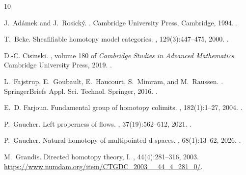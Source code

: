 \documentclass[12pt,a4paper]{amsart}
\theoremstyle{definition}
\begin{document}
\begin{thebibliography}{10}
	
	J.~Ad{\'a}mek and J.~Rosick{\'y}.
	.
	\newblock Cambridge University Press, Cambridge, 1994.
	\newblock \href {https://doi.org/10.1017/CBO9780511600579}
	{}.
	
	T.~Beke.
	\newblock Sheafifiable homotopy model categories.
	, 129(3):447--475, 2000.
	\newblock \href {https://doi.org/10.1017/S0305004100004722}
	{}.
	
	D.-C. Cisinski.
	, volume 180 of {\em
		Cambridge Studies in Advanced Mathematics}.
	\newblock Cambridge University Press, 2019.
	\newblock \href {https://doi.org/10.1017/9781108588737}
	{}.
	
	L.~Fajstrup, E.~Goubault, E.~Haucourt, S.~Mimram, and M.~Raussen.
	.
	\newblock SpringerBriefs Appl. Sci. Technol. Springer, 2016.
	\newblock \href {https://doi.org/10.1007/978-3-319-15398-8}
	{}.
	
	E.~D. Farjoun.
	\newblock Fundamental group of homotopy colimits.
	, 182(1):1--27, 2004.
	\newblock \href {https://doi.org/10.1016/S0001-8708(03)00072-0}
	{}.
	
	P.~Gaucher.
	\newblock Left properness of flows.
	, 37(19):562--612, 2021.
	\newblock \href {https://doi.org/10.70930/tac/c4rpm1y7}
	{}.
	
	P.~Gaucher.
	\newblock Natural homotopy of multipointed d-spaces.
	, 68(1):13--62, 2026.
	\newblock \href {https://doi.org/10.18926/mjou/70890}
	{}.
	
	M.~Grandis.
	\newblock Directed homotopy theory, {I}.
	, 44(4):281--316, 2003.
	\newblock \url{https://www.numdam.org/item/CTGDC_2003__44_4_281_0/}.
	

\end{thebibliography}
\end{document}
